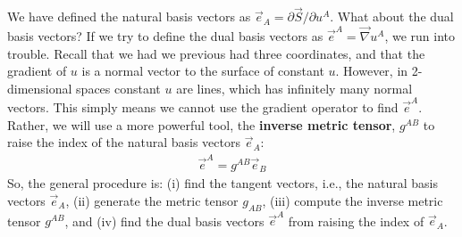 \documentclass{book}
\theoremstyle{definition}
\begin{document}
We have defined the natural basis vectors as $\vec{e}_A = \partial \vec{S}/\partial u^A$. What about the dual basis vectors? If we try to define the dual basis vectors as $\vec{e}^A = \vec{\nabla}u^A$, we run into trouble. Recall that we had we previous had three coordinates, and that the gradient of $u$ is a normal vector to the surface of constant $u$. However, in 2-dimensional spaces constant $u$ are lines, which has infinitely many normal vectors. This simply means we cannot use the gradient operator to find $\vec{e}^A$. Rather, we will use a more powerful tool, the \textbf{inverse metric tensor}, $g^{AB}$ to raise the index of the natural basis vectors $\vec{e}_A$:
\begin{align*}
\boxed{\vec{e}^A = g^{AB}\vec{e}_B}
\end{align*}
So, the general procedure is: (i) find the tangent vectors, i.e., the natural basis vectors $\vec{e}_A$, (ii) generate the metric tensor $g_{AB}$, (iii) compute the inverse metric tensor $g^{AB}$, and (iv) find the dual basis vectors $\vec{e}^A$ from raising the index of $\vec{e}_A$.\\
\end{document}
